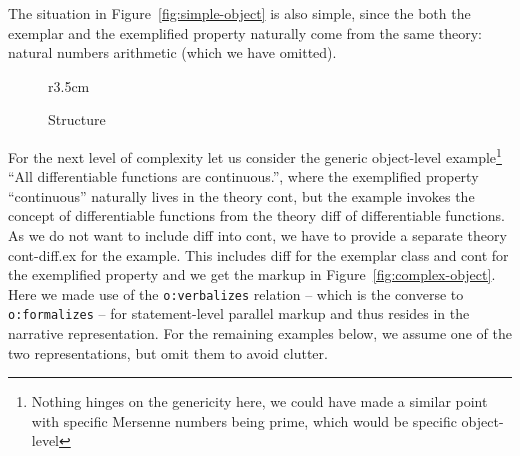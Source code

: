 \documentclass[11pt]{bluenote}
\begin{document}
The situation in Figure~\ref{fig:simple-object} is also simple, since the both the
exemplar and the exemplified property naturally come from the same theory: natural numbers
arithmetic (which we have omitted).

\begin{wrapfigure}r{3.5cm}\centering%
\vspace*{-1em}
\caption{Structure}\label{fig:diffcont}\vspace*{-1em}
\end{wrapfigure}
For the next level of complexity let us consider the generic object-level
example\footnote{Nothing hinges on the genericity here, we could have made a similar point
  with specific Mersenne numbers being prime, which would be specific object-level} ``All
differentiable functions are continuous.'', where the exemplified property ``continuous''
naturally lives in the theory \textsf{cont}, but the example invokes the concept of
differentiable functions from the theory \textsf{diff} of differentiable functions. As we
do not want to include \textsf{diff} into \textsf{cont}, we have to provide a separate
theory \textsf{cont-diff.ex} for the example. This includes \textsf{diff} for the exemplar
class and \textsf{cont} for the exemplified property and we get the markup in
Figure~\ref{fig:complex-object}. Here we made use of the \lstinline|o:verbalizes| relation
-- which is the converse to \lstinline|o:formalizes| -- for statement-level parallel
markup and thus resides in the narrative representation. For the remaining examples below,
we assume one of the two representations, but omit them to avoid clutter.
\end{document}
